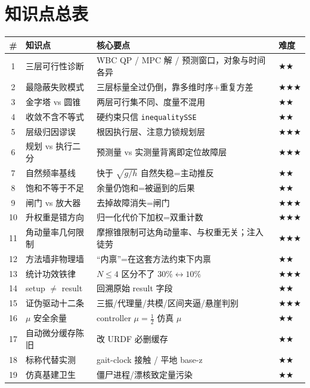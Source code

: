 \section*{知识点总表}
\begin{table}[H]\centering\small
\begin{tabular}{clll}
\toprule
\# & 知识点 & 核心要点 & 难度 \\
\midrule
1 & 三层可行性诊断 & WBC QP / MPC 解 / 预测窗口，对象与时间各异 & \(\bigstar\bigstar\) \\
2 & 最隐蔽失败模式 & 三层标量全过仍倒，靠多维时序+重复方差 & \(\bigstar\bigstar\bigstar\) \\
3 & 金字塔 vs 圆锥 & 两层可行集不同、度量不混用 & \(\bigstar\bigstar\) \\
4 & 收敛不含不等式 & 硬约束只信 \texttt{inequalitySSE} & \(\bigstar\bigstar\) \\
5 & 层级归因谬误 & 根因执行层、注意力锁规划层 & \(\bigstar\bigstar\bigstar\) \\
6 & 规划 vs 执行二分 & 预测量 vs 实测量背离即定位故障层 & \(\bigstar\bigstar\bigstar\) \\
7 & 自然频率基线 & 快于 $\sqrt{g/h}$ 自然失稳=主动推反 & \(\bigstar\bigstar\) \\
8 & 饱和不等于不足 & 余量仍饱和=被逼到的后果 & \(\bigstar\bigstar\) \\
9 & 闸门 vs 放大器 & 去掉故障消失=闸门 & \(\bigstar\bigstar\bigstar\) \\
10 & 升权重是错方向 & 归一化代价下加权=双重计数 & \(\bigstar\bigstar\bigstar\) \\
11 & 角动量率几何限制 & 摩擦锥限制可达角动量率、与权重无关；注入徒劳 & \(\bigstar\bigstar\bigstar\) \\
12 & 方法墙非物理墙 & “内禀”=在这套方法约束下内禀 & \(\bigstar\bigstar\) \\
13 & 统计功效铁律 & $N\le 4$ 区分不了 $30\%{\leftrightarrow}10\%$ & \(\bigstar\bigstar\bigstar\) \\
14 & setup $\ne$ result & 回溯原始 result 字段 & \(\bigstar\bigstar\) \\
15 & 证伪驱动十二条 & 三振/代理量/共模/区间夹逼/悬崖判别 & \(\bigstar\bigstar\bigstar\) \\
16 & $\mu$ 安全余量 & controller $\mu=\tfrac12$ 仿真 $\mu$ & \(\bigstar\bigstar\) \\
17 & 自动微分缓存陈旧 & 改 URDF 必删缓存 & \(\bigstar\bigstar\) \\
18 & 标称代替实测 & gait-clock 接触 / 平地 base-z & \(\bigstar\bigstar\) \\
19 & 仿真基建卫生 & 僵尸进程/漂核致定量污染 & \(\bigstar\bigstar\) \\
\bottomrule
\end{tabular}
\end{table}

